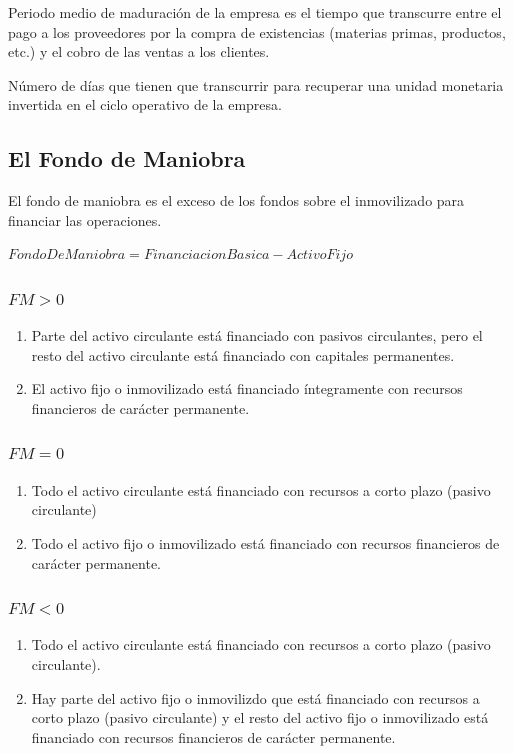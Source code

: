 Periodo medio de maduración de la empresa es el tiempo que transcurre entre el pago a los proveedores por la compra de existencias (materias primas, productos, etc.) y el cobro de las ventas a los clientes.

Número de días que tienen que transcurrir para recuperar una unidad monetaria invertida en el ciclo operativo de la empresa.

\subsection{El Fondo de Maniobra}

El fondo de maniobra es el exceso de los fondos sobre el inmovilizado para financiar las operaciones.

$Fondo De Maniobra = Financiacion Basica - Activo Fijo$

\subsubsection{$FM > 0$}
\begin{enumerate}
    \item Parte del activo circulante está financiado con pasivos circulantes, pero el resto del activo circulante está financiado con capitales permanentes.
    \item El activo fijo o inmovilizado está financiado íntegramente con recursos financieros de carácter permanente.
\end{enumerate}

\subsubsection{$FM = 0$}
\begin{enumerate}
    \item Todo el activo circulante está financiado con recursos a corto plazo (pasivo circulante)
    \item Todo el activo fijo o inmovilizado está financiado con recursos financieros de carácter permanente.
\end{enumerate}

\subsubsection{$FM < 0$}
\begin{enumerate}
    \item Todo el activo circulante está financiado con recursos a corto plazo (pasivo circulante).
    \item Hay parte del activo fijo o inmovilizdo que está financiado con recursos a corto plazo (pasivo circulante) y el resto del activo fijo o inmovilizado está financiado con recursos financieros de carácter permanente.
\end{enumerate}

